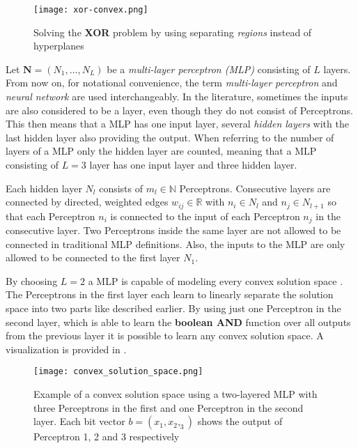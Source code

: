 \begin{figure}[htb!]
    \centering
    \texttt{[image: xor-convex.png]}
    \caption{Solving the \textbf{XOR} problem by using separating \textit{regions} instead of hyperplanes \cite{rojas_neural_1996}}
    \label{fig:xor-convex}
\end{figure}

Let $\bm{N} = (N_1, \dots, N_L)$ be a \textit{multi-layer perceptron (MLP)} consisting of $L$ layers.
From now on, for notational convenience, the term \textit{multi-layer perceptron} and \textit{neural network} are used interchangeably.
In the literature, sometimes the inputs are also considered to be a layer, even though they do not consist of Perceptrons.
This then means that a MLP has one input layer, several \textit{hidden layers} with the last hidden layer also providing the output.
When referring to the number of layers of a MLP only the hidden layer are counted, meaning that a MLP consisting of $L=3$ layer has one input layer and three hidden layer.

Each hidden layer $N_l$ consists of $m_l \in \mathbb{N}$ Perceptrons.
Consecutive layers are connected by directed, weighted edges $w_{ij} \in \mathbb{R}$ with $n_i \in N_l$ and $n_j \in N_{l+1}$ so that each Perceptron $n_i$ is connected to the input of each Perceptron $n_j$ in the consecutive layer.
Two Perceptrons inside the same layer are not allowed to be connected in traditional MLP definitions.
Also, the inputs to the MLP are only allowed to be connected to the first layer $N_1$.

By choosing $L=2$ a MLP is capable of modeling every convex solution space \cite{rojas_neural_1996}.
The Perceptrons in the first layer each learn to linearly separate the solution space into two parts like described earlier.
By using just one Perceptron in the second layer, which is able to learn the \textbf{boolean AND} function over all outputs from the previous layer it is possible to learn any convex solution space.
A visualization is provided in .

\begin{figure}[htb!]
    \centering
    \texttt{[image: convex\_solution\_space.png]}
    \caption{Example of a convex solution space using a two-layered MLP with three Perceptrons in the first and one Perceptron in the second layer. Each bit vector $b = (x_1, x_2, _3)$ shows the output of Perceptron 1, 2 and 3 respectively \cite{rojas_neural_1996}}
    \label{fig:convex-solution}
\end{figure}

